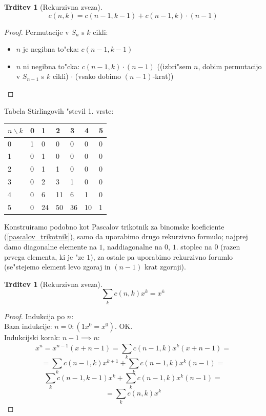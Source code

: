 \documentclass[a4paper,12pt]{article}
\theoremstyle{definition}
\newtheorem{claim}[counter]{Trditev}
\theoremstyle{remark}
\begin{document}
\begin{claim}[Rekurzivna zveza]
	\[c(n, k) = c(n-1, k-1) + c(n-1, k)\cdot(n-1)\]
\end{claim}

\begin{proof}
	Permutacije v $S_n$ s $k$ cikli:
	\begin{itemize}
	    \item $n$ je negibna to"cka: $c(n-1, k-1)$
	    \item $n$ ni negibna to"cka: $c(n-1, k)  \cdot (n-1)$ ((izbri"sem $n$, dobim permutacijo v $S_{n-1}$ s $k$ cikli) $\cdot$ (vsako dobimo $(n-1)$-krat))
	\end{itemize}
\end{proof}


Tabela Stirlingovih "stevil 1. vrste:
\begin{center}
	\begin{tabular}{l|llllll}
	    $n \backslash k$ & 0 & 1  & 2  & 3  & 4  & 5 \\
	    \hline
	    0 & 1 & 0  & 0  & 0  & 0  & 0 \\
	    1 & 0 & 1  & 0  & 0  & 0  & 0 \\
	    2 & 0 & 1  & 1  & 0  & 0  & 0 \\
	    3 & 0 & 2  & 3  & 1  & 0  & 0 \\
	    4 & 0 & 6  & 11 & 6  & 1  & 0 \\
	    5 & 0 & 24 & 50 & 36 & 10 & 1
	\end{tabular}
\end{center}
Konstruiramo podobno kot Pascalov trikotnik za binomske koeficiente (\ref{pascalov_trikotnik}), samo da uporabimo drugo rekurzivno formulo; najprej damo diagonalne elemente na $1$, naddiagonalne na $0$, $1$. stoplec na 0 (razen prvega elementa, ki je "ze $1$), za ostale pa uporabimo rekurzivno forumlo (se"stejemo element levo zgoraj in $(n-1)$ krat zgornji). \label{konstrukcija_tabele}

\begin{claim}[Rekurzivna zveza]\label{rekurzivna_cnk_narascajoce}
    \[\sum_k c(n,k)x^k = x^{\overline{n}}\]
\end{claim}

\begin{proof}
    Indukcija po $n$:\\
    Baza indukcije: $n = 0: (1x^0 = x^0)$. OK.\\
    Indukcijski korak: $n - 1 \implies n$:\\
    \[x^{\overline{n}} = x^{\overline{n-1}}(x+n-1) = \sum_k c(n-1,k)x^k (x+n-1) =\]
    \[= \sum_k c(n-1,k)x^{k+1} + \sum_k c(n-1,k)x^k (n-1) = \]
    \[\sum_k c(n-1,k-1)x^{k} + \sum_k c(n-1,k)x^k (n-1) =\]
    \[= \sum_k c(n,k)x^k\]
\end{proof}
\end{document}

